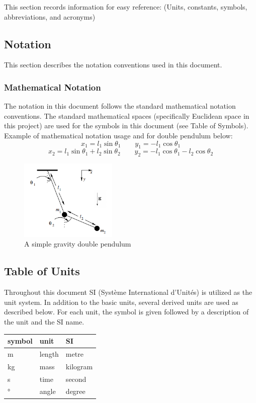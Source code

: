 \documentclass[12pt]{article}
\begin{document}
This section records information for easy reference: (Units, constants, 
symbols, abbreviations, and acronyms)

\subsection{Notation}

This section describes the notation conventions used in this document.

\subsubsection{Mathematical Notation}

The notation in this document follows the standard mathematical notation
conventions.
The standard mathematical spaces (specifically Euclidean space in this project)
are used for the symbols in this document (see Table of Symbols).
Example of mathematical notation usage and for double pendulum below:
$$x_1 = l_1 \sin\theta_1 \quad\quad y_1 = -l_1 \cos\theta_1$$
$$x_2 = l_1 \sin\theta_1 + l_2 \sin\theta_2 \quad\quad y_2 = -l_1\cos\theta_1
-l_2\cos\theta_2$$

\begin{figure}[h]
	\centering
	\includegraphics[width=175px]{doublepend.PNG}
\caption{A simple gravity double pendulum~\citep{SzuminskiOlsztyn2012}}
	\label{fig:doublepend}
\end{figure}

\newpage

\subsection{Table of Units}

Throughout this document SI (Syst\`{e}me International d'Unit\'{e}s) is
utilized as the unit system. In addition to the basic units, several derived
units are used as described below.  
For each unit, the symbol is given followed by a
description of the unit and the SI name.

\renewcommand{\arraystretch}{1.2}
\begin{center}
  \noindent \begin{tabular}{l l l} 
    \toprule		
    \textbf{symbol} & \textbf{unit} & \textbf{SI}\\
    \midrule 
    \si{\metre} & length & metre\\
    \si{\kilogram} & mass & kilogram\\
    \si{\second} & time & second\\
    \si{\degree} & angle & degree\\
    \bottomrule
  \end{tabular}
\end{center}
\end{document}
